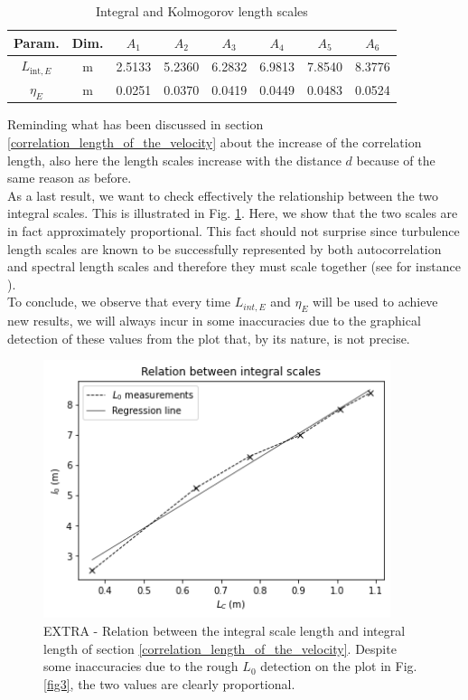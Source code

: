\documentclass[11pt,titlepage]{article}
\begin{document}
\begin{table}[h]
\centering
\caption{Integral and Kolmogorov length scales}\label{tab3}
    \begin{tabular}{ | c | c | c | c | c | c | c | c |}
    \hline
    Param. & Dim. & $A_1$ & $A_2$ & $A_3$ & $A_4$ & $A_5$ & $A_6$ \\
    \hline
    $L_{\mathrm{int},E}$ & m & 2.5133 &5.2360& 6.2832& 6.9813& 7.8540 &8.3776\\
    \hline
    $\eta_E$ & m& 0.0251 &0.0370&0.0419&0.0449& 0.0483& 0.0524 \\
    \hline
    \end{tabular}
\end{table}
Reminding what has been discussed in section \ref{correlation_length_of_the_velocity} about the increase of the correlation length, also here the length scales increase with the distance $d$ because of the same reason as before. \\
As a last result, we want to check effectively the relationship between the two integral scales. This is illustrated in Fig. \ref{fig4}. Here, we show that the two scales are in fact approximately proportional. This fact should not surprise since turbulence length scales are known to be successfully represented by both autocorrelation and spectral length scales and therefore they must scale together (see for instance \cite{trush_2020}).\\
To conclude, we observe that every time $L_{int,E}$ and $\eta_E$ will be used to achieve new results, we will always incur in some inaccuracies due to the graphical detection of these values from the plot that, by its nature, is not precise.
	\begin{center} 
	\begin{figure} [h]
		\centering
		\includegraphics[width = 4in]{./figures/ex1_3_plus.png}
		\caption{EXTRA - Relation between the integral scale length and integral length of section \ref{correlation_length_of_the_velocity}. Despite some inaccuracies due to the rough $L_0$ detection on the plot in Fig. \ref{fig3}, the two values are clearly proportional.}
		\label{fig4}
	\end{figure}
\end{center}
\end{document}
